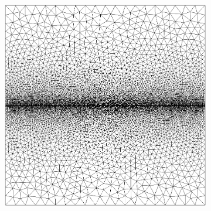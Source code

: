 \begin{figure}[htb!]
\begin{subfigure}[b]{0.19\textwidth}
    \caption{}
    \label{fig: Chapter4/mode1_notch_mesh}
  \end{subfigure}
  \hspace{0.05\textwidth}
  \begin{subfigure}[b]{0.19\textwidth}
    \centering
    \includegraphics[width=\textwidth]{Chapter4/figures/mode1_initial_mesh.png}
    \caption{}
    \label{fig: Chapter4/mode1_initial_mesh}
  \end{subfigure}
  

\end{figure}

